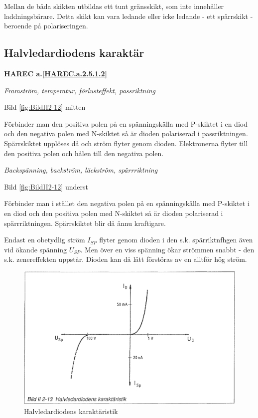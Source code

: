 Mellan de båda skikten utbildas ett tunt gränsskikt, som inte innehåller
laddningsbärare. Detta skikt kan vara ledande eller icke ledande - ett
spärrskikt - beroende på polariseringen.

\subsection{Halvledardiodens karaktär}
\textbf{HAREC a.\ref{HAREC.a.2.5.1.2}\label{myHAREC.a.2.5.1.2}}

\emph{Framström, temperatur, förlusteffekt, passriktning}

Bild \ref{fig:BildII2-12} mitten

Förbinder man den positiva polen på en spänningskälla med P-skiktet i en diod
och den negativa polen med N-skiktet så är dioden polariserad i passriktningen.
Spärrskiktet upplöses då och ström flyter genom dioden. Elektronerna flyter till
den positiva polen och hålen till den negativa polen.

\emph{Backspänning, backström, läckström, spärrriktning}

Bild \ref{fig:BildII2-12} underst

Förbinder man i stället den negativa polen på en spänningskälla med P-skiktet i
en diod och den positiva polen med N-skiktet så är dioden polariserad i
spärrriktningen. Spärrskiktet blir då ännu kraftigare.

Endast en obetydlig ström \(I_{SP}\) flyter genom dioden i den s.k.
spärriktnfhgen även vid ökande spänning \(U_{SP}\). Men över en viss spänning
ökar strömmen snabbt - den s.k. zenereffekten uppstår. Dioden kan då lätt
förstöras av en alltför hög ström.

\begin{figure}[h]
\begin{center}
\includegraphics[width=14cm]{images/bild_2_2-13}
\caption{Halvledardiodens karaktäristik}
\label{fig:BildII2-13}
\end{center}
\end{figure}

